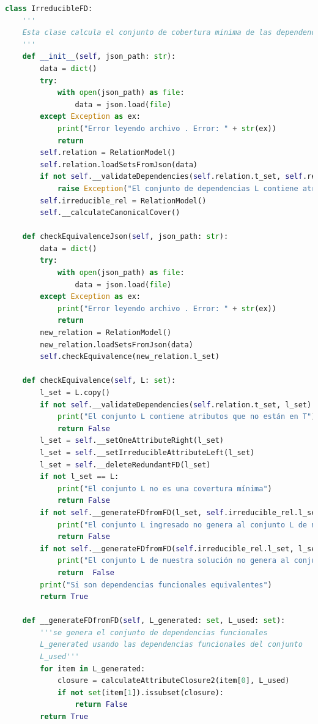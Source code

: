 \documentclass[a4paper,12pt]{article}
\begin{document}
{\begin{lstlisting}[language=python, caption={Clase que calcula la cobertura mínima y valida conjuntos de dependencias equivalentes.\\\hspace{\textwidth}}, captionpos=t]
class IrreducibleFD:
    '''
    Esta clase calcula el conjunto de cobertura minima de las dependencias funcionales
    '''
    def __init__(self, json_path: str):
        data = dict()
        try:
            with open(json_path) as file:
                data = json.load(file)
        except Exception as ex:
            print("Error leyendo archivo . Error: " + str(ex))
            return
        self.relation = RelationModel()
        self.relation.loadSetsFromJson(data)
        if not self.__validateDependencies(self.relation.t_set, self.relation.l_set):
            raise Exception("El conjunto de dependencias L contiene atributos que no están en T")
        self.irreducible_rel = RelationModel()
        self.__calculateCanonicalCover()

    def checkEquivalenceJson(self, json_path: str):
        data = dict()
        try:
            with open(json_path) as file:
                data = json.load(file)
        except Exception as ex:
            print("Error leyendo archivo . Error: " + str(ex))
            return
        new_relation = RelationModel()
        new_relation.loadSetsFromJson(data)
        self.checkEquivalence(new_relation.l_set)

    def checkEquivalence(self, L: set):
        l_set = L.copy()
        if not self.__validateDependencies(self.relation.t_set, l_set):
            print("El conjunto L contiene atributos que no están en T")
            return False
        l_set = self.__setOneAttributeRight(l_set)
        l_set = self.__setIrreducibleAttributeLeft(l_set)
        l_set = self.__deleteRedundantFD(l_set)
        if not l_set == L:
            print("El conjunto L no es una covertura mínima")
            return False
        if not self.__generateFDfromFD(l_set, self.irreducible_rel.l_set):
            print("El conjunto L ingresado no genera al conjunto L de nuestra solución")
            return False
        if not self.__generateFDfromFD(self.irreducible_rel.l_set, l_set):
            print("El conjunto L de nuestra solución no genera al conjunto L ingresado")
            return  False
        print("Si son dependencias funcionales equivalentes")
        return True

    def __generateFDfromFD(self, L_generated: set, L_used: set):
        '''se genera el conjunto de dependencias funcionales
        L_generated usando las dependencias funcionales del conjunto
        L_used'''
        for item in L_generated:
            closure = calculateAttributeClosure2(item[0], L_used)
            if not set(item[1]).issubset(closure):
                return False
        return True



\end{lstlisting}}
\end{document}
